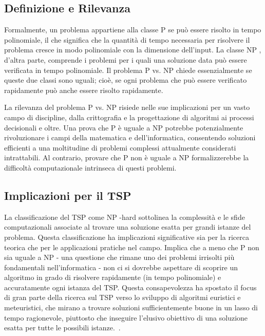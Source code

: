 \subsection{Definizione e Rilevanza}

Formalmente, un problema appartiene alla classe \gls{P} se può essere risolto in tempo polinomiale, il che significa che la quantità di tempo necessaria per risolvere il problema cresce in modo polinomiale con la dimensione dell'input. La classe \gls{NP} , d'altra parte, comprende i problemi per i quali una soluzione data può essere verificata in tempo polinomiale. Il problema \gls{P} vs. \gls{NP} chiede essenzialmente se queste due classi sono uguali; cioè, se ogni problema che può essere verificato rapidamente può anche essere risolto rapidamente.

La rilevanza del problema \gls{P} vs. \gls{NP} risiede nelle sue implicazioni per un vasto campo di discipline, dalla crittografia e la progettazione di algoritmi ai processi decisionali e oltre. Una prova che \gls{P} è uguale a \gls{NP} potrebbe potenzialmente rivoluzionare i campi della matematica e dell'informatica, consentendo soluzioni efficienti a una moltitudine di problemi complessi attualmente considerati intrattabili. Al contrario, provare che \gls{P} non è uguale a \gls{NP} formalizzerebbe la difficoltà computazionale intrinseca di questi problemi.

\subsection{Implicazioni per il \gls{TSP}}

La classificazione del \gls{TSP} come \gls{NP} -hard sottolinea la complessità e le sfide computazionali associate al trovare una soluzione esatta per grandi istanze del problema. Questa classificazione ha implicazioni significative sia per la ricerca teorica che per le applicazioni pratiche nel campo. Implica che a meno che \gls{P} non sia uguale a \gls{NP} - una questione che rimane uno dei problemi irrisolti più fondamentali nell'informatica - non ci si dovrebbe aspettare di scoprire un algoritmo in grado di risolvere rapidamente (in tempo polinomiale) e accuratamente ogni istanza del \gls{TSP}. Questa consapevolezza ha spostato il focus di gran parte della ricerca sul \gls{TSP} verso lo sviluppo di algoritmi euristici e meteuristici, che mirano a trovare soluzioni sufficientemente buone in un lasso di tempo ragionevole, piuttosto che inseguire l'elusivo obiettivo di una soluzione esatta per tutte le possibili istanze.~\cite{Karp1972}.

